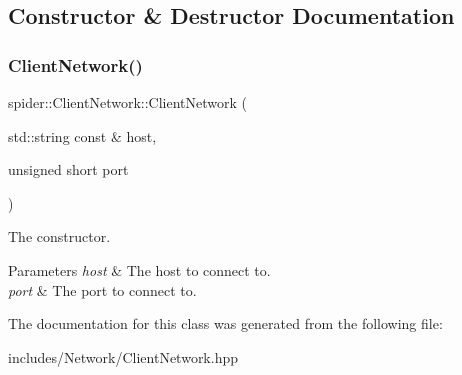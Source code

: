 \subsection{Constructor \& Destructor Documentation}
\mbox{\label{classspider_1_1_client_network_a03f8f213aa0855475d2884cdfd12cd34}} 
\subsubsection{Client\+Network()}
{\footnotesize\ttfamily spider\+::\+Client\+Network\+::\+Client\+Network (\begin{DoxyParamCaption}\item[{std\+::string const \&}]{host,  }\item[{unsigned short}]{port }\end{DoxyParamCaption})}



The constructor. 


\begin{DoxyParams}{Parameters}
{\em host} & The host to connect to. \\
\hline
{\em port} & The port to connect to. \\
\hline
\end{DoxyParams}


The documentation for this class was generated from the following file\+:\begin{DoxyCompactItemize}
\item 
includes/\+Network/Client\+Network.\+hpp\end{DoxyCompactItemize}
